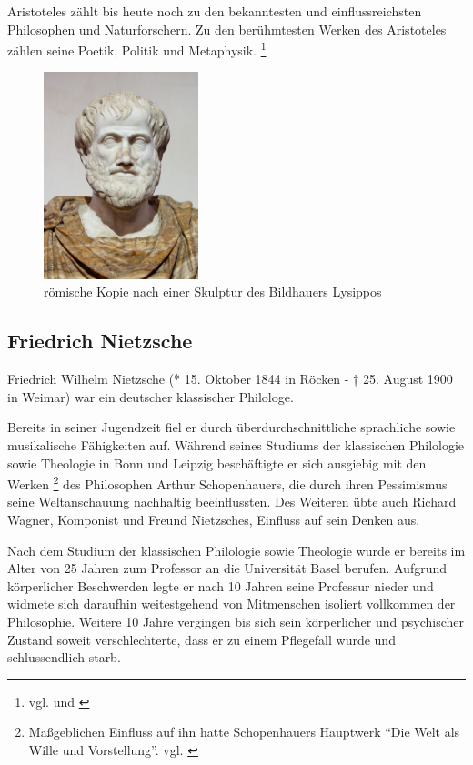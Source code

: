 Aristoteles zählt bis heute noch zu den bekanntesten und einflussreichsten Philosophen und Naturforschern. Zu den berühmtesten Werken des Aristoteles zählen seine Poetik, Politik und Metaphysik.
\footnote{vgl. \cite{Aristoteles1} und \cite{Aristoteles2}}
\begin{figure}[H]
\centering 
 \includegraphics[width=0.4\textwidth]{Bilder/kap3/Aristoteles} 
 \caption{römische Kopie nach einer Skulptur des Bildhauers Lysippos \cite{WikiAR}  \label{portraitAristotles}}
\end{figure}

\subsection{Friedrich Nietzsche}
Friedrich Wilhelm Nietzsche (* 15. Oktober 1844 in Röcken - † 25. August 1900 in Weimar) war ein deutscher klassischer Philologe.

Bereits in seiner Jugendzeit fiel er durch überdurchschnittliche sprachliche sowie musikalische Fähigkeiten auf.
Während seines Studiums der klassischen Philologie sowie Theologie in Bonn und Leipzig beschäftigte er sich ausgiebig mit den Werken
\footnote{Maßgeblichen Einfluss auf ihn hatte Schopenhauers Hauptwerk \enquote{Die Welt als Wille und Vorstellung}. vgl. \cite{Schopenhauer1}}
des Philosophen Arthur Schopenhauers, die durch ihren Pessimismus seine Weltanschauung nachhaltig beeinflussten.
Des Weiteren übte auch Richard Wagner, Komponist und Freund Nietzsches, Einfluss auf sein Denken aus.

Nach dem Studium der klassischen Philologie sowie Theologie wurde er bereits im Alter von 25 Jahren zum Professor an die Universität Basel berufen.
Aufgrund körperlicher Beschwerden legte er nach 10 Jahren seine Professur nieder und widmete sich daraufhin weitestgehend von Mitmenschen isoliert vollkommen der Philosophie.
Weitere 10 Jahre vergingen bis sich sein körperlicher und psychischer Zustand soweit verschlechterte, dass er zu einem Pflegefall wurde und schlussendlich starb.

